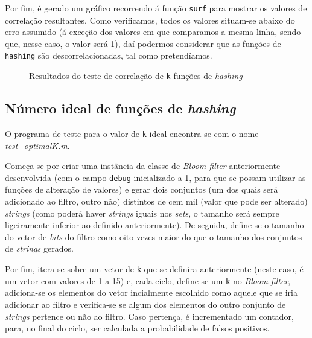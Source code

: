 \documentclass[a4paper,11pt,openright,oneside]{report}
\begin{document}
Por fim, é gerado um gráfico recorrendo á função \texttt{surf} para mostrar os valores de correlação resultantes. Como verificamos, todos os valores situam-se abaixo do erro assumido (á exceção dos valores em que comparamos a mesma linha, sendo que, nesse caso, o valor será 1), daí podermos considerar que as funções de \texttt{hashing} são descorrelacionadas, tal como pretendíamos.

\begin{figure}[ht]	
\center
{}
\caption{Resultados do teste de correlação de \texttt{k} funções de \textit{hashing}}
\label{fig:hashcorr}
\end{figure}

\subsection{Número ideal de funções de \textit{hashing}}
\label{subsec.optimalk}

O programa de teste para o valor de \texttt{k} ideal encontra-se com o nome \textit{test\_optimalK.m}.

Começa-se por criar uma instância da classe de \textit{Bloom-filter} anteriormente desenvolvida (com o campo \texttt{debug} inicializado a 1, para que se possam utilizar as funções de alteração de valores) e gerar dois conjuntos (um dos quais será adicionado ao filtro, outro não) distintos de cem mil (valor que pode ser alterado) \textit{strings} (como poderá haver \textit{strings} iguais nos \textit{sets}, o tamanho será sempre ligeiramente inferior ao definido anteriormente). De seguida, define-se o tamanho do vetor de \textit{bits} do filtro como oito vezes maior do que o tamanho dos conjuntos de \textit{strings} gerados.

Por fim, itera-se sobre um vetor de \texttt{k} que se definira anteriormente (neste caso, é um vetor com valores de 1 a 15) e, cada ciclo, define-se um \texttt{k} no \textit{Bloom-filter}, adiciona-se os elementos do vetor incialmente escolhido como aquele que se iria adicionar ao filtro e verifica-se se algum dos elementos do outro conjunto de \textit{strings} pertence ou não ao filtro. Caso pertença, é incrementado um contador, para, no final do ciclo, ser calculada a probabilidade de falsos positivos.
\end{document}
